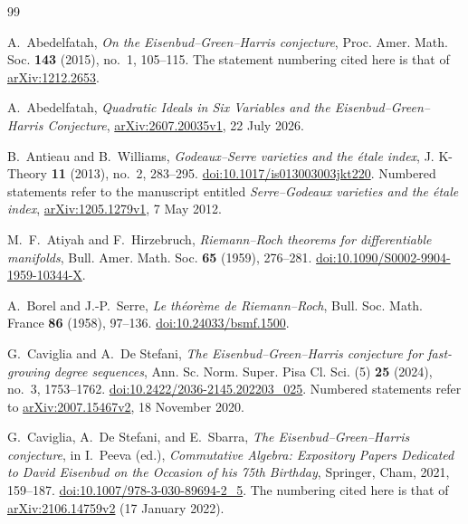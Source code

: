 \begin{thebibliography}{99}

A.~Abedelfatah,
\emph{On the Eisenbud--Green--Harris conjecture},
Proc. Amer. Math. Soc. \textbf{143} (2015), no.~1, 105--115.
The statement numbering cited here is that of
\href{https://arxiv.org/abs/1212.2653}{arXiv:1212.2653}.

A.~Abedelfatah,
\emph{Quadratic Ideals in Six Variables and the Eisenbud--Green--Harris
Conjecture},
\href{https://arxiv.org/abs/2607.20035v1}{arXiv:2607.20035v1},
22 July 2026.

B.~Antieau and B.~Williams,
\emph{Godeaux--Serre varieties and the \'etale index},
J. K-Theory \textbf{11} (2013), no.~2, 283--295.
\href{https://doi.org/10.1017/is013003003jkt220}{doi:10.1017/is013003003jkt220}.
Numbered statements refer to the manuscript entitled
\emph{Serre--Godeaux varieties and the \'etale index},
\href{https://arxiv.org/abs/1205.1279v1}{arXiv:1205.1279v1},
7 May 2012.

M.~F.~Atiyah and F.~Hirzebruch,
\emph{Riemann--Roch theorems for differentiable manifolds},
Bull. Amer. Math. Soc. \textbf{65} (1959), 276--281.
\href{https://doi.org/10.1090/S0002-9904-1959-10344-X}{doi:10.1090/S0002-9904-1959-10344-X}.

A.~Borel and J.-P.~Serre,
\emph{Le th\'eor\`eme de Riemann--Roch},
Bull. Soc. Math. France \textbf{86} (1958), 97--136.
\href{https://doi.org/10.24033/bsmf.1500}{doi:10.24033/bsmf.1500}.

G.~Caviglia and A.~De Stefani,
\emph{The Eisenbud--Green--Harris conjecture for fast-growing degree sequences},
Ann. Sc. Norm. Super. Pisa Cl. Sci. (5) \textbf{25} (2024), no.~3,
1753--1762.
\href{https://doi.org/10.2422/2036-2145.202203_025}{doi:10.2422/2036-2145.202203\_025}.
Numbered statements refer to
\href{https://arxiv.org/abs/2007.15467v2}{arXiv:2007.15467v2},
18 November 2020.

G.~Caviglia, A.~De Stefani, and E.~Sbarra,
\emph{The Eisenbud--Green--Harris conjecture},
in I.~Peeva (ed.), \emph{Commutative Algebra: Expository Papers Dedicated
to David Eisenbud on the Occasion of his 75th Birthday},
Springer, Cham, 2021, 159--187.
\href{https://doi.org/10.1007/978-3-030-89694-2_5}{doi:10.1007/978-3-030-89694-2\_5}.
The numbering cited here is that of
\href{https://arxiv.org/abs/2106.14759v2}{arXiv:2106.14759v2}
(17 January 2022).


\end{thebibliography}
